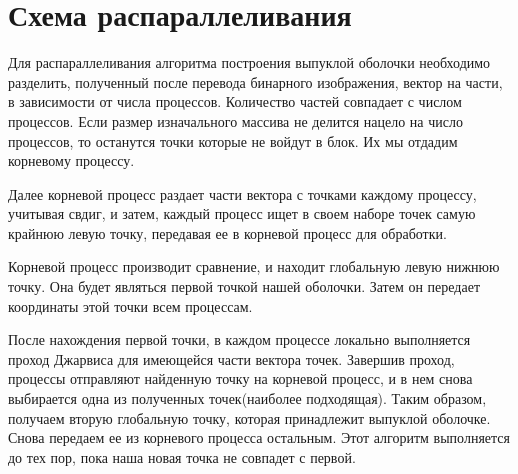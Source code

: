 \documentclass{report}
\begin{document}
\section*{Схема распараллеливания}
Для распараллеливания алгоритма построения выпуклой оболочки необходимо разделить, полученный после перевода бинарного изображения, вектор на части, в зависимости от числа процессов. Количество частей совпадает с числом процессов. Если размер изначального массива не делится нацело на число процессов, то останутся точки которые не войдут в блок. Их мы отдадим корневому процессу.
\par
Далее корневой процесс раздает части вектора с точками каждому процессу, учитывая свдиг, и затем, каждый процесс ищет в своем наборе точек самую крайнюю левую точку, передавая ее в корневой процесс для обработки.
\par
Корневой процесс производит сравнение, и находит глобальную левую нижнюю точку. Она будет являться первой точкой нашей оболочки. Затем он передает координаты этой точки всем процессам.
\par
После нахождения первой точки, в каждом процессе локально выполняется проход Джарвиса для имеющейся части вектора точек. Завершив проход, процессы отправляют найденную точку на корневой процесс, и в нем снова выбирается одна из полученных точек(наиболее подходящая). Таким образом, получаем вторую глобальную точку, которая принадлежит выпуклой оболочке. Снова передаем ее из корневого процесса остальным. Этот алгоритм выполняется до тех пор, пока наша новая точка не совпадет с первой. 
\newpage

\end{document}
